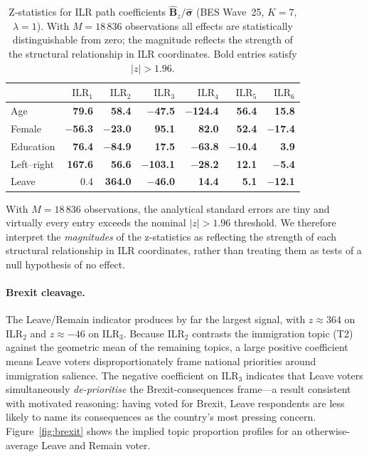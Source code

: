 \begin{table}[!ht]
\centering
\small
\caption{Z-statistics for ILR path coefficients
  $\hat{\mathbf{B}}_z / \hat{\boldsymbol{\sigma}}$ (BES Wave~25,
  $K=7$, $\lambda=1$).  With $M=18\,836$ observations all effects are
  statistically distinguishable from zero; the magnitude reflects the
  strength of the structural relationship in ILR coordinates.
  Bold entries satisfy $|z|>1.96$.}
\label{tab:bes_zstat}
\begin{tabular}{lrrrrrr}
\toprule
 & $\mathrm{ILR}_1$ & $\mathrm{ILR}_2$ & $\mathrm{ILR}_3$
 & $\mathrm{ILR}_4$ & $\mathrm{ILR}_5$ & $\mathrm{ILR}_6$ \\
\midrule
Age         & \textbf{79.6}  & \textbf{58.4}  & \textbf{$-$47.5}  & \textbf{$-$124.4} & \textbf{56.4}  & \textbf{15.8}  \\
Female      & \textbf{$-$56.3} & \textbf{$-$23.0} & \textbf{95.1} & \textbf{82.0}  & \textbf{52.4}  & \textbf{$-$17.4} \\
Education   & \textbf{76.4}  & \textbf{$-$84.9} & \textbf{17.5} & \textbf{$-$63.8} & \textbf{$-$10.4} & \textbf{3.9}  \\
Left--right & \textbf{167.6} & \textbf{56.6}  & \textbf{$-$103.1} & \textbf{$-$28.2} & \textbf{12.1}  & \textbf{$-$5.4} \\
Leave       & 0.4            & \textbf{364.0} & \textbf{$-$46.0}  & \textbf{14.4}  & \textbf{5.1}   & \textbf{$-$12.1} \\
\bottomrule
\end{tabular}
\end{table}

With $M = 18\,836$ observations, the analytical standard errors are tiny
and virtually every entry exceeds the nominal $|z| > 1.96$ threshold.
We therefore interpret the \emph{magnitudes} of the z-statistics as
reflecting the strength of each structural relationship in ILR coordinates,
rather than treating them as tests of a null hypothesis of no effect.

\paragraph{Brexit cleavage.}
The Leave/Remain indicator produces by far the largest signal, with
$z \approx 364$ on $\mathrm{ILR}_2$ and $z \approx -46$ on
$\mathrm{ILR}_3$.  Because $\mathrm{ILR}_2$ contrasts the immigration
topic (T2) against the geometric mean of the remaining topics, a large
positive coefficient means Leave voters disproportionately frame national
priorities around immigration salience.  The negative coefficient on
$\mathrm{ILR}_3$ indicates that Leave voters simultaneously
\emph{de-prioritise} the Brexit-consequences frame---a result consistent
with motivated reasoning: having voted for Brexit, Leave respondents are
less likely to name its consequences as the country's most pressing
concern.  Figure~\ref{fig:brexit} shows the implied topic proportion
profiles for an otherwise-average Leave and Remain voter.

